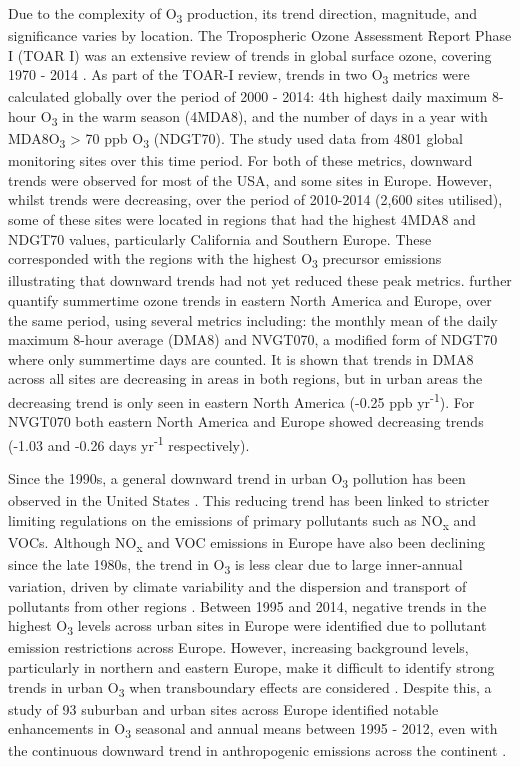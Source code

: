 \documentclass[journal abbreviation, manuscript]{copernicus}
\begin{document}
Due to the complexity of O\textsubscript{3} production, its trend direction, magnitude, and significance varies by location. The Tropospheric Ozone Assessment Report Phase I (TOAR I) was an extensive review of trends in global surface ozone, covering 1970 - 2014 \citep{fleming_2018, Gaudel2018}. As part of the TOAR-I review, trends in two O\textsubscript{3} metrics were calculated globally over the period of 2000 - 2014: 4th highest daily maximum 8-hour O\textsubscript{3} in the warm season (4MDA8), and the number of days in a year with MDA8O\textsubscript{3} > 70 ppb O\textsubscript{3} (NDGT70). The study used data from 4801 global monitoring sites over this time period. For both of these metrics, downward trends were observed for most of the USA, and some sites in Europe. However, whilst trends were decreasing, over the period of 2010-2014 (2,600 sites utilised), some of these sites were located in regions that had the highest 4MDA8 and NDGT70 values, particularly California and Southern Europe. These corresponded with the regions with the highest O\textsubscript{3} precursor emissions illustrating that downward trends had not yet reduced these peak metrics. \cite{Chang_2017} further quantify summertime ozone trends in eastern North America and Europe, over the same period, using several metrics including: the monthly mean of the daily maximum 8-hour average (DMA8) and NVGT070, a modified form of NDGT70 where only summertime days are counted. It is shown that trends in DMA8 across all sites are decreasing in areas in both regions, but in urban areas the decreasing trend is only seen in eastern North America (-0.25 ppb yr\textsuperscript{-1}). For NVGT070 both eastern North America and Europe showed decreasing trends (-1.03 and -0.26 days yr\textsuperscript{-1} respectively).

Since the 1990s, a general downward trend in urban O\textsubscript{3} pollution has been observed in the United States \citep{acp-20-3191-2020}. This reducing trend has been linked to stricter limiting regulations on the emissions of primary pollutants such as NO\textsubscript{x} and VOCs. Although NO\textsubscript{x} and VOC emissions in Europe have also been declining since the late 1980s, the trend in O\textsubscript{3} is less clear due to large inner-annual variation, driven by climate variability and the dispersion and transport of pollutants from other regions \citep{acp-6-51-2006, acp-18-5589-2018}. Between 1995 and 2014, negative trends in the highest O\textsubscript{3} levels across urban sites in Europe were identified due to pollutant emission restrictions across Europe. However, increasing background levels, particularly in northern and eastern Europe, make it difficult to identify strong trends in urban O\textsubscript{3} when transboundary effects are considered \citep{acp-18-5589-2018}. Despite this, a study of 93 suburban and urban sites across Europe identified notable enhancements in O\textsubscript{3} seasonal and annual means between 1995 - 2012, even with the continuous downward trend in anthropogenic emissions across the continent \citep{acp-18-5589-2018}.
\end{document}
